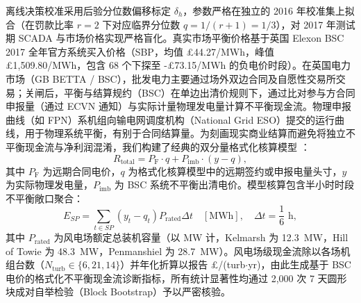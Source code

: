 离线决策校准采用后验分位数偏移标定 $\delta_h$，参数严格在独立的 2016 年校准集上拟合（在罚款比率 $r=2$ 下对应临界分位数 $q = 1/(r+1) = 1/3$），对 2017 年测试期 SCADA 与市场价格实现严格盲化。真实市场平衡价格基于英国 Elexon BSC 2017 全年官方系统买入价格（SBP，均值 \pounds 44.27/MWh，峰值 \pounds 1,509.80/MWh，包含 68 个下探至 -\pounds 73.15/MWh 的负电价时段）。在英国电力市场（GB BETTA / BSC），批发电力主要通过场外双边合同及自愿性交易所交易；关闸后，平衡与结算规约（BSC）在单边出清价规则下，通过比对参与方合同申报量（通过 ECVN 通知）与实际计量物理发电量计算不平衡现金流。物理申报曲线（如 FPN）系机组向输电网调度机构（National Grid ESO）提交的运行曲线，用于物理系统平衡，有别于合同结算量。为刻画现实商业结算而避免将独立不平衡现金流与净利润混淆，我们构建了经典的双分量格式化核算模型 \cite{pinson2007trading}：
\begin{equation}
R_{\text{total}} = P_{\text{F}} \cdot q + P_{\text{imb}} \cdot (y - q),
\label{eq:two_settlement}
\end{equation}
其中 $P_{\text{F}}$ 为远期合同电价，$q$ 为格式化核算模型中的远期签约或申报电量头寸，$y$ 为实际物理发电量，$P_{\text{imb}}$ 为 BSC 系统不平衡出清电价。模型核算包含半小时时段不平衡敞口聚合：
\begin{equation}
E_{SP} = \sum_{t \in SP} (y_t - q_t) P_{\text{rated}} \Delta t \quad [\text{MWh}], \quad \Delta t = \frac{1}{6}\text{ h},
\label{eq:bsc_netting}
\end{equation}
其中 $P_{\text{rated}}$ 为风电场额定总装机容量（以 MW 计，Kelmarsh 为 12.3~MW，Hill of Towie 为 48.3~MW，Penmanshiel 为 28.7~MW）。风电场级现金流除以各场机组台数（$N_{\text{turb}} \in \{6, 21, 14\}$）并年化折算以报告 \pounds/(turb$\cdot$yr)，由此生成基于 BSC 电价的格式化不平衡现金流诊断指标，所有统计显著性均通过 2,000 次 7 天圆形块成对自举检验（Block Bootstrap）予以严密核验。
